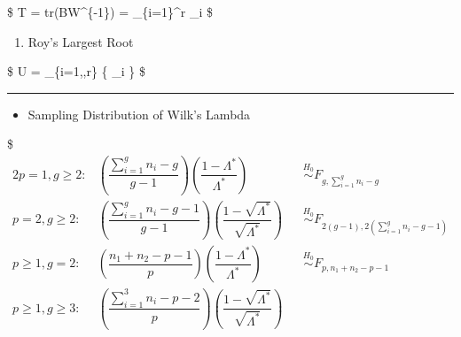 \documentclass[
]{book}
\providecommand{\tightlist}{%
  \setlength{\itemsep}{0pt}\setlength{\parskip}{0pt}}
\begin{document}
{{\$
T = tr\left(BW\^{}\{-1\}\right) = \sum\_\{i=1\}\^{}r \lambda\_i
\$

\begin{enumerate}
\def\labelenumi{\arabic{enumi}.}
\setcounter{enumi}{3}
\tightlist
\item
  Roy's Largest Root
\end{enumerate}

\$
U = \max\_\{i=1,\cdots,r\} \left\{ \lambda\_i \right\}
\$

\begin{center}\rule{0.5\linewidth}{0.5pt}\end{center}

\begin{itemize}
\tightlist
\item
  Sampling Distribution of Wilk's Lambda
\end{itemize}

\$
\begin{alignat*}{2}
p=1, g \ge 2:

&\left(\dfrac{\sum_{i=1}^g n_i - g}{g-1}\right) \left(\dfrac{1-\Lambda^\ast}{\Lambda^\ast}\right)

&&\overset{H_0}{\sim} F_{g, \sum_{i=1}^g n_i - g}

\\






p=2, g \ge 2:

&\left(\dfrac{\sum_{i=1}^g n_i - g-1}{g-1}\right) \left(\dfrac{1-\sqrt{\Lambda^\ast}}{\sqrt{\Lambda^\ast}}\right)

&&\overset{H_0}{\sim} F_{2(g-1), 2(\sum_{i=1}^g n_i - g-1)}

\\







p\ge1, g = 2:

&\left(\dfrac{n_1 + n_2 - p -1}{p}\right) \left(\dfrac{1-\Lambda^\ast}{\Lambda^\ast}\right)

&&\overset{H_0}{\sim} F_{p, n_1 + n_2 - p -1}

\\







p \ge 1, g \ge 3:

&\left(\dfrac{\sum_{i=1}^3 n_i - p-2}{p}\right) \left(\dfrac{1-\sqrt{\Lambda^\ast}}{\sqrt{\Lambda^\ast}}\right)


\end{alignat*}}}
\end{document}

